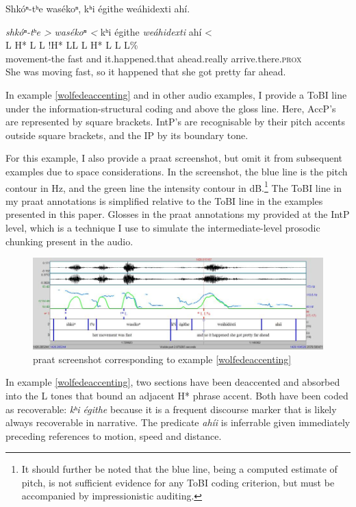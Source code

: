 \documentclass[output=paper]{LSP/langsci}
\begin{document}
\ea\label{wolfedeaccenting}
Shkóⁿ-tʰe wasékoⁿ, kʰi égithe weáhidexti ahí.\footnotemark

\glll 	\emph{shkóⁿ-tʰe >}	\emph{wasékoⁿ <}		kʰi 		égithe 		\emph{weáhidexti}		{ahí <}\\
	{\ob L H* L\cb}		{\ob L !H* L\cb{}L}		{\ob L}	{}			{H* L}				{\cb{}L L\%}\\
	movement-the 		fast 				and 		it.happened.that 	ahead.really	 		arrive.there.\textsc{prox}\\
\glt She was moving fast, so it happened that she got pretty far ahead.
\z

In example \ref{wolfedeaccenting} and in other audio examples, I provide a ToBI line under the information-structural coding and above the gloss line. Here, AccP’s are represented by square brackets. IntP’s are recognisable by their pitch accents outside square brackets, and the IP by its boundary tone. 

For this example, I also provide a praat \citep{BoersmaWeenink1992} screenshot, but omit it from subsequent examples due to space considerations. In the screenshot, the blue line is the pitch contour in Hz, and the green line the intensity contour in dB.\footnote{It should further be noted that the blue line, being a computed estimate of pitch, is not sufficient evidence for any ToBI coding criterion, but must be accompanied by impressionistic auditing.} The ToBI line in my praat annotations is simplified relative to the ToBI line in the examples presented in this paper. Glosses in the praat annotations my provided at the IntP level, which is a technique I use to simulate the intermediate-level prosodic chunking present in the audio.

\begin{figure}\includegraphics[width=12cm]{figures/Gordon1}\caption{praat screenshot corresponding to example \ref{wolfedeaccenting}}\label{wolfedeaccentingscreenshot}\end{figure}

In example \ref{wolfedeaccenting}, two sections have been deaccented and absorbed into the L tones that bound an adjacent H* phrase accent. Both have been coded as recoverable: \textit{kʰi égithe} because it is a frequent discourse marker that is likely always recoverable in narrative. The predicate \textit{ahíi} is inferrable given immediately preceding references to motion, speed and distance.
\end{document}
